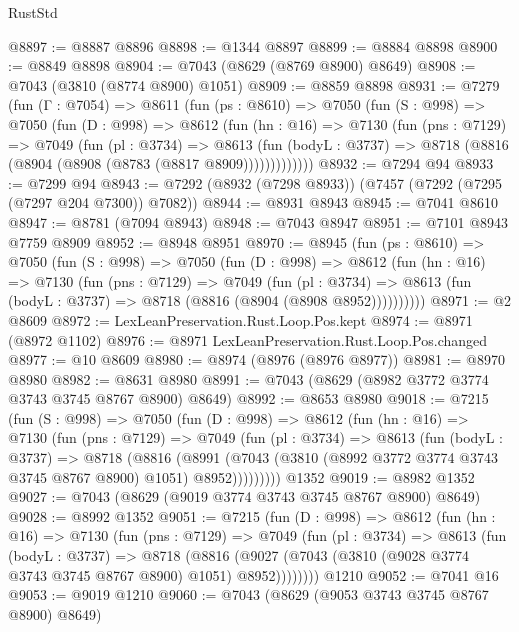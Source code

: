 \begin{lexlean}{RustStd}
\begin{coremodule}
@8897 := @8887 @8896
@8898 := @1344 @8897
@8899 := @8884 @8898
@8900 := @8849 @8898
@8904 := @7043 (@8629 (@8769 @8900) @8649)
@8908 := @7043 (@3810 (@8774 @8900) @1051)
@8909 := @8859 @8898
@8931 := @7279
    (fun (Γ : @7054) =>
    @8611
      (fun (ps : @8610) =>
      @7050
        (fun (S : @998) =>
        @7050
          (fun (D : @998) =>
          @8612
            (fun (hn : @16) =>
            @7130
              (fun (pns : @7129) =>
              @7049
                (fun (pl : @3734) =>
                @8613
                  (fun (bodyL : @3737) =>
                  @8718 (@8816 (@8904 (@8908 (@8783 (@8817 @8909)))))))))))))
@8932 := @7294 @94
@8933 := @7299 @94
@8943 := @7292 (@8932 (@7298 @8933)) (@7457 (@7292 (@7295 (@7297 @204 @7300)) @7082))
@8944 := @8931 @8943
@8945 := @7041 @8610
@8947 := @8781 (@7094 @8943)
@8948 := @7043 @8947
@8951 := @7101 @8943 @7759 @8909
@8952 := @8948 @8951
@8970 := @8945
    (fun (ps : @8610) =>
    @7050
      (fun (S : @998) =>
      @7050
        (fun (D : @998) =>
        @8612
          (fun (hn : @16) =>
          @7130
            (fun (pns : @7129) =>
            @7049
              (fun (pl : @3734) =>
              @8613 (fun (bodyL : @3737) => @8718 (@8816 (@8904 (@8908 @8952))))))))))
@8971 := @2 @8609
@8972 := LexLeanPreservation.Rust.Loop.Pos.kept
@8974 := @8971 (@8972 @1102)
@8976 := @8971 LexLeanPreservation.Rust.Loop.Pos.changed
@8977 := @10 @8609
@8980 := @8974 (@8976 (@8976 @8977))
@8981 := @8970 @8980
@8982 := @8631 @8980
@8991 := @7043 (@8629 (@8982 @3772 @3774 @3743 @3745 @8767 @8900) @8649)
@8992 := @8653 @8980
@9018 := @7215
    (fun (S : @998) =>
    @7050
      (fun (D : @998) =>
      @8612
        (fun (hn : @16) =>
        @7130
          (fun (pns : @7129) =>
          @7049
            (fun (pl : @3734) =>
            @8613
              (fun (bodyL : @3737) =>
              @8718
                (@8816
                  (@8991
                    (@7043 (@3810 (@8992 @3772 @3774 @3743 @3745 @8767 @8900) @1051) @8952)))))))))
    @1352
@9019 := @8982 @1352
@9027 := @7043 (@8629 (@9019 @3774 @3743 @3745 @8767 @8900) @8649)
@9028 := @8992 @1352
@9051 := @7215
    (fun (D : @998) =>
    @8612
      (fun (hn : @16) =>
      @7130
        (fun (pns : @7129) =>
        @7049
          (fun (pl : @3734) =>
          @8613
            (fun (bodyL : @3737) =>
            @8718
              (@8816 (@9027 (@7043 (@3810 (@9028 @3774 @3743 @3745 @8767 @8900) @1051) @8952))))))))
    @1210
@9052 := @7041 @16
@9053 := @9019 @1210
@9060 := @7043 (@8629 (@9053 @3743 @3745 @8767 @8900) @8649)

\end{coremodule}
\end{lexlean}
